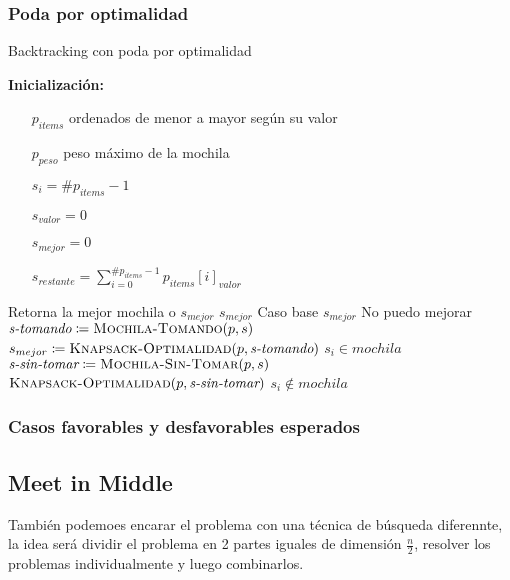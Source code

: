 \documentclass[fleqn, 11pt]{article}
\def\is{\coloneqq}
\begin{document}
\subsubsection{Poda por optimalidad}
\begin{algorithm}
\caption{Backtracking con poda por optimalidad}
\begin{algorithmic}[1]
\item[\textbf{Inicialización:}]
\item[] \begin{itemize}
	\item[] $p_{items}$ ordenados de menor a mayor según su valor
	\item[] $p_{peso}$ peso máximo de la mochila
	\item[] $s_i = \#p_{items} - 1$
	\item[] $s_{valor} = 0$
	\item[] $s_{mejor} = 0$
	\item[] $s_{restante} = \sum_{i = 0}^{\#p_{items} - 1} p_{items}[i]_{valor}$
\end{itemize}
\Statex
{}
\Comment Retorna la mejor mochila o $s_{mejor}$
	\State \Return $s_{mejor}$
	\Comment Caso base
\EndIf
{}
	\State \Return $s_{mejor}$
	\Comment No puedo mejorar
\EndIf
{}
	\State $\textit{s-tomando} \is \Call{Mochila-Tomando}{p, s}$
	\State $s_{mejor} \is \Call{Knapsack-Optimalidad}{p, \textit{s-tomando}}$
	\Comment $s_i \in mochila$
\EndIf
\State $\textit{s-sin-tomar} \is \Call{Mochila-Sin-Tomar}{p, s}$
\State \Return $\Call{Knapsack-Optimalidad}{p, \textit{s-sin-tomar}}$
\Comment $s_i \not\in mochila$
\EndFunction
\end{algorithmic}
\end{algorithm}

\subsubsection{Casos favorables y desfavorables esperados}

\subsection{Meet in Middle}

También podemoes encarar el problema con una técnica de búsqueda diferennte, la
idea será dividir el problema en 2 partes iguales de dimensión $\frac{n}{2}$,
resolver los problemas individualmente y luego combinarlos.
\end{document}
